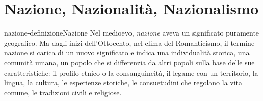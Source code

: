 \documentclass[preview]{standalone}
\begin{document}
\section{Nazione, Nazionalità, Nazionalismo}

\begin{snippetdefinition}{nazione-definizione}{Nazione}
    Nel medioevo, \textit{nazione} aveva un significato puramente geografico.
    Ma dagli inizi dell'Ottocento, nel clima del Romanticismo, il
    termine nazione si carica di un nuovo significato e indica una individualità storica, una
    comunità umana, un popolo che si differenzia da altri popoli sulla base delle sue
    caratteristiche: il profilo etnico o la consanguineità, il legame con un territorio, la lingua, la
    cultura, le esperienze storiche, le consuetudini che regolano la vita comune, le tradizioni
    civili e religiose.
\end{snippetdefinition}
\end{document}
